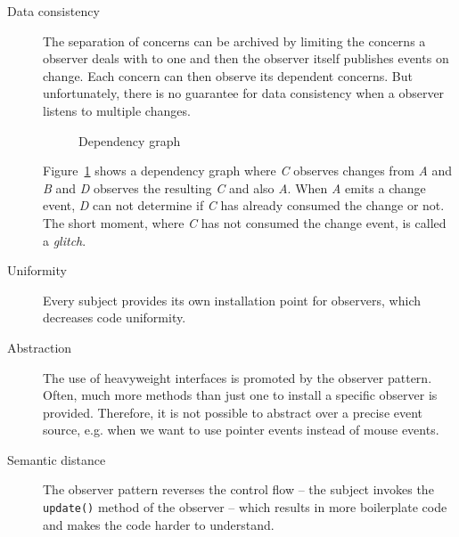 \documentclass[acmsmall]{acmart}\settopmatter{printfolios=true,printccs=false,printacmref=false}
\begin{document}
\begin{description}
			\item[Data consistency]
			The separation of concerns can be archived by limiting the concerns a observer deals with to one and then the observer itself publishes events on change.
			Each concern can then observe its dependent concerns.
			But unfortunately, there is no guarantee for data consistency when a observer listens to multiple changes. 
			\begin{figure}[H]
				\caption{Dependency graph}
				\label{fig:glitchgraph}
			\end{figure}
			Figure~\ref{fig:glitchgraph} shows a dependency graph where \textit{C} observes changes from \textit{A} and \textit{B} and \textit{D} observes the resulting \textit{C} and also \textit{A}.
			When \textit{A} emits a change event, \textit{D} can not determine if \textit{C} has already consumed the change or not. 
			The short moment, where \textit{C} has not consumed the change event, is called a \textit{glitch}.
			\item[Uniformity]
			Every subject provides its own installation point for observers, which decreases code uniformity.
			\item[Abstraction]
			The use of heavyweight interfaces is promoted by the observer pattern. 
			Often, much more methods than just one to install a specific observer is provided. 
			Therefore, it is not possible to abstract over a precise event source, e.g. when we want to use pointer events instead of mouse events.
			\item[Semantic distance]
			The observer pattern reverses the control flow -- the subject invokes the \lstinline|update()| method of the observer -- which results in more boilerplate code and makes the code harder to understand.
		\end{description}
		
\end{document}
